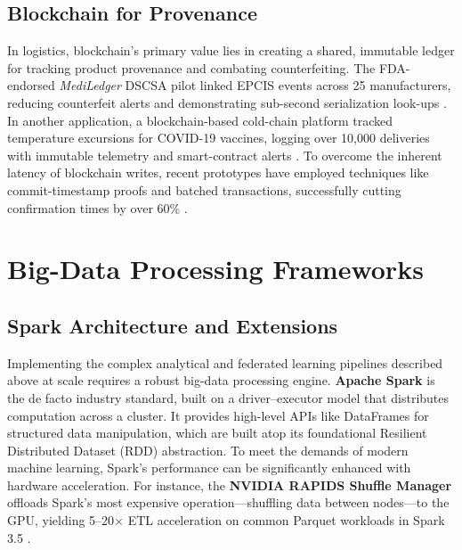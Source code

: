 \documentclass[12pt]{report}
\begin{document}
\subsection{Blockchain for Provenance}
In logistics, blockchain's primary value lies in creating a shared, immutable ledger for tracking product provenance and combating counterfeiting. The FDA-endorsed \emph{MediLedger} DSCSA pilot linked EPCIS events across 25 manufacturers, reducing counterfeit alerts and demonstrating sub-second serialization look-ups \cite{MediLedger2023}. In another application, a blockchain-based cold-chain platform tracked temperature excursions for COVID-19 vaccines, logging over 10,000 deliveries with immutable telemetry and smart-contract alerts \cite{Antal2021VaxChain}. To overcome the inherent latency of blockchain writes, recent prototypes have employed techniques like commit-timestamp proofs and batched transactions, successfully cutting confirmation times by over 60\% \cite{Wang2022Latency}.

\section{Big-Data Processing Frameworks}\label{sec:spark}

\subsection{Spark Architecture and Extensions}
Implementing the complex analytical and federated learning pipelines described above at scale requires a robust big-data processing engine. \textbf{Apache Spark} is the de facto industry standard, built on a driver–executor model that distributes computation across a cluster. It provides high-level APIs like DataFrames for structured data manipulation, which are built atop its foundational Resilient Distributed Dataset (RDD) abstraction. To meet the demands of modern machine learning, Spark's performance can be significantly enhanced with hardware acceleration. For instance, the \textbf{NVIDIA RAPIDS Shuffle Manager} offloads Spark's most expensive operation—shuffling data between nodes—to the GPU, yielding 5–20$\times$ ETL acceleration on common Parquet workloads in Spark 3.5 \cite{RAPIDS2024Shuffle}.
\end{document}
